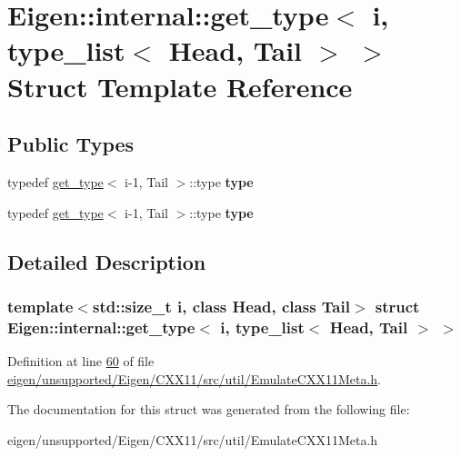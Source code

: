 \hypertarget{struct_eigen_1_1internal_1_1get__type_3_01i_00_01type__list_3_01_head_00_01_tail_01_4_01_4}{}\section{Eigen\+:\+:internal\+:\+:get\+\_\+type$<$ i, type\+\_\+list$<$ Head, Tail $>$ $>$ Struct Template Reference}
\label{struct_eigen_1_1internal_1_1get__type_3_01i_00_01type__list_3_01_head_00_01_tail_01_4_01_4}
\subsection*{Public Types}
\begin{DoxyCompactItemize}
\item 
\mbox{\label{struct_eigen_1_1internal_1_1get__type_3_01i_00_01type__list_3_01_head_00_01_tail_01_4_01_4_a364430b26fd64a4e7b2c018ef42cb24b}} 
typedef \hyperlink{struct_eigen_1_1internal_1_1get__type}{get\+\_\+type}$<$ i-\/1, Tail $>$\+::type {\bfseries type}
\item 
\mbox{\label{struct_eigen_1_1internal_1_1get__type_3_01i_00_01type__list_3_01_head_00_01_tail_01_4_01_4_a364430b26fd64a4e7b2c018ef42cb24b}} 
typedef \hyperlink{struct_eigen_1_1internal_1_1get__type}{get\+\_\+type}$<$ i-\/1, Tail $>$\+::type {\bfseries type}
\end{DoxyCompactItemize}


\subsection{Detailed Description}
\subsubsection*{template$<$std\+::size\+\_\+t i, class Head, class Tail$>$\newline
struct Eigen\+::internal\+::get\+\_\+type$<$ i, type\+\_\+list$<$ Head, Tail $>$ $>$}



Definition at line \hyperlink{eigen_2unsupported_2_eigen_2_c_x_x11_2src_2util_2_emulate_c_x_x11_meta_8h_source_l00060}{60} of file \hyperlink{eigen_2unsupported_2_eigen_2_c_x_x11_2src_2util_2_emulate_c_x_x11_meta_8h_source}{eigen/unsupported/\+Eigen/\+C\+X\+X11/src/util/\+Emulate\+C\+X\+X11\+Meta.\+h}.



The documentation for this struct was generated from the following file\+:\begin{DoxyCompactItemize}
\item 
eigen/unsupported/\+Eigen/\+C\+X\+X11/src/util/\+Emulate\+C\+X\+X11\+Meta.\+h\end{DoxyCompactItemize}
